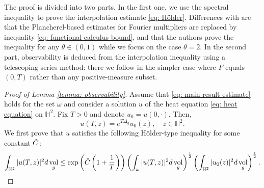 \documentclass[letterpaper,11pt]{amsart}
\theoremstyle{note}
\numberwithin{equation}{section}
\DeclareMathOperator{\vol}{vol}
\begin{document}
The proof is divided into two parts. In the first one, we use the spectral inequality to prove the interpolation estimate \eqref{eq: Hölder}. Differences with \cite{wangwangzhangzhang2019spectralineq_heat} are that the Plancherel-based estimates for Fourier multipliers are replaced by inequality \eqref{eq: functional calculus bound}, and that the authors prove the inequality for any $\theta \in (0,1)$ while we focus on the case $\theta = 2$. In the second part, observability is deduced from the interpolation inequality using a telescoping series method: there we follow \cite{wangwangzhangzhang2019spectralineq_heat} in the simpler case where $F$ equals $(0,T)$ rather than any positive-measure subset.

\begin{proof}[Proof of Lemma \ref{lemma: observability}]
    Assume that \eqref{eq: main result estimate} holds for the set $\omega$ and consider a solution $u$ of the heat equation \eqref{eq: heat equation} on $\mathbb{H}^2$. Fix $T > 0$ and denote $u_0 = u(0,\cdot)$. Then, $$u(T, z) = e^{T\Delta_g}u_0(z), \quad z \in \mathbb{H}^2.$$ We first prove that $u$ satisfies the following Hölder-type inequality for some constant $\Tilde{C}$: \begin{equation}
        \label{eq: Hölder}
        \int_{\mathbb{H}^2} |u(T,z)|^2 d\vol_g \leq \exp\left(\Tilde{C}\left(1+\frac{1}{T}\right)\right) \left( \int_\omega |u(T,z)|^2 d\vol_g\right)^\frac{1}{2} \left(\int_{\mathbb{H}^2} |u_0(z)|^2 d\vol_g \right)^\frac{1}{2}.
    \end{equation}
    

\end{proof}
\end{document}
